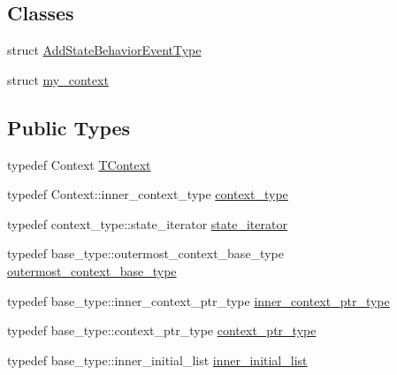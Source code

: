 \subsection*{Classes}
\begin{DoxyCompactItemize}
\item 
struct \hyperlink{structsmacc_1_1SmaccState_1_1AddStateBehaviorEventType}{Add\+State\+Behavior\+Event\+Type}
\item 
struct \hyperlink{structsmacc_1_1SmaccState_1_1my__context}{my\+\_\+context}
\end{DoxyCompactItemize}
\subsection*{Public Types}
\begin{DoxyCompactItemize}
\item 
typedef Context \hyperlink{classsmacc_1_1SmaccState_a9953ba0428a8c46f7d72c70bc3f87db4}{T\+Context}
\item 
typedef Context\+::inner\+\_\+context\+\_\+type \hyperlink{classsmacc_1_1SmaccState_a65c128d05dbcadbf817f41ba20b8fa01}{context\+\_\+type}
\item 
typedef context\+\_\+type\+::state\+\_\+iterator \hyperlink{classsmacc_1_1SmaccState_a12497b38e710f07cacb5d45efc024339}{state\+\_\+iterator}
\item 
typedef base\+\_\+type\+::outermost\+\_\+context\+\_\+base\+\_\+type \hyperlink{classsmacc_1_1SmaccState_aaf76bbe2aa9dd73e3284605f84ab4b16}{outermost\+\_\+context\+\_\+base\+\_\+type}
\item 
typedef base\+\_\+type\+::inner\+\_\+context\+\_\+ptr\+\_\+type \hyperlink{classsmacc_1_1SmaccState_a65a772c2e2039e9a59148ba6ffb54d8a}{inner\+\_\+context\+\_\+ptr\+\_\+type}
\item 
typedef base\+\_\+type\+::context\+\_\+ptr\+\_\+type \hyperlink{classsmacc_1_1SmaccState_a0e15b77514301039f6bc093a9d3f6425}{context\+\_\+ptr\+\_\+type}
\item 
typedef base\+\_\+type\+::inner\+\_\+initial\+\_\+list \hyperlink{classsmacc_1_1SmaccState_acb4ac84bce421d39b594510a6b2df558}{inner\+\_\+initial\+\_\+list}
\end{DoxyCompactItemize}
